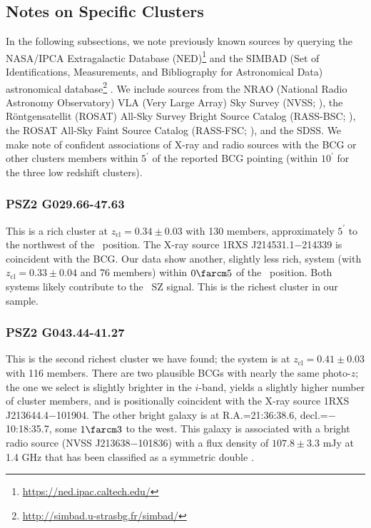 \documentclass[apj, revtex4-1]{emulateapj}
\begin{document}
\subsection{Notes on Specific Clusters}\label{sec:notes}
In the following subsections, we note previously known sources by querying the NASA/IPCA Extragalactic Database (NED)\footnote{\url{https://ned.ipac.caltech.edu/}} and the SIMBAD (Set of Identifications, Measurements, and Bibliography for Astronomical Data) astronomical database\footnote{\url{http://simbad.u-strasbg.fr/simbad/}} \citep{Wenger2000}. We include sources from the NRAO (National Radio Astronomy Observatory) VLA (Very Large Array) Sky Survey (NVSS; \citealt{Condon1998}), the R\"{o}ntgensatellit (ROSAT) All-Sky Survey Bright Source Catalog (RASS-BSC; \citealt{Voges1999a}), the ROSAT All-Sky Faint Source Catalog (RASS-FSC; \citealt{Voges2000}), and the SDSS. We make note of confident associations of X-ray and radio sources with the BCG or other clusters members within $5^\prime$ of the reported BCG pointing (within $10^\prime$ for the three low redshift clusters).

\subsubsection{PSZ2 G029.66-47.63} %
This is a rich cluster at $z_\mathrm{cl} = 0.34 \pm 0.03$ with 130 members, approximately $5^\prime$ to the northwest of the \planck\ position. The X-ray source 1RXS J214531.1$-$214339 is coincident with the BCG. Our data show another, slightly less rich, system (with $z_\mathrm{cl} = 0.33 \pm 0.04$ and 76 members) within $0\farcm5$ of the \planck\ position. Both systems likely contribute to the \planck\ SZ signal. This is the richest cluster in our sample.

\subsubsection{PSZ2 G043.44-41.27} %
This is the second richest cluster we have found; the system is at $z_\mathrm{cl} = 0.41 \pm 0.03$ with 116 members. There are two plausible BCGs with nearly the same photo-$z$; the one we select is slightly brighter in the $i$-band, yields a slightly higher number of cluster members, and is positionally coincident with the X-ray source 1RXS J213644.4$-$101904. The other bright galaxy is at R.A.=21:36:38.6, decl.=$-$10:18:35.7, some $1\farcm3$ to the west. This galaxy is associated with a bright radio source (NVSS J213638$-$101836) with a flux density of $107.8 \pm 3.3$ mJy at 1.4 GHz that has been classified as a symmetric double \citep{Douglas1996}.
\end{document}
